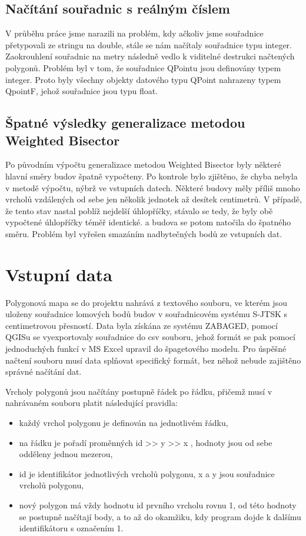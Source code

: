 \documentclass[11pt]{article}
\begin{document}
	
	\subsection{Načítání souřadnic s reálným číslem}
	V průběhu práce jsme narazili na problém, kdy ačkoliv jsme souřadnice přetypovali ze stringu na double, stále se nám načítaly souřadnice typu integer. Zaokrouhlení souřadnic na metry následně vedlo k viditelné destrukci načtených polygonů. Problém byl v tom, že souřadnice QPointu jsou definovány typem integer. Proto byly všechny objekty datového typu QPoint nahrazeny typem QpointF, jehož souřadnice jsou typu float.
	
	\subsection{Špatné výsledky generalizace metodou Weighted Bisector}
	Po původním výpočtu generalizace metodou Weighted Bisector byly některé hlavní směry budov špatně vypočteny. Po kontrole bylo zjištěno, že chyba nebyla v metodě výpočtu, nýbrž ve vstupních datech. Některé budovy měly příliš mnoho vrcholů vzdálených od sebe jen několik jednotek až desítek centimetrů. V případě, že tento stav nastal poblíž nejdelší úhlopříčky, stávalo se tedy, že byly obě vypočtené úhlopříčky téměř identické. a budova se potom natočila do špatného směru. Problém byl vyřešen smazáním nadbytečných bodů ze vstupních dat. 

	
	
	
	\section{Vstupní data}
	Polygonová mapa se do projektu nahrává z textového souboru, ve kterém jsou uloženy souřadnice lomových bodů budov v souřadnicovém systému S-JTSK s centimetrovou přesností. Data byla získána ze systému ZABAGED, pomocí QGISu se vyexportovaly souřadnice do csv souboru, jehož formát se pak pomocí jednoduchých funkcí v MS Excel upravil do špagetového modelu. Pro úspěšné načtení souboru musí data splňovat specifický formát, bez něhož nebude zajištěno správné načítání dat.  
	
	Vrcholy polygonů jsou načítány postupně řádek po řádku, přičemž musí v nahrávaném souboru platit následující pravidla:    
	
	\begin{itemize}
		\item každý vrchol polygonu je definován na jednotlivém řádku,
		\item na řádku je pořadí proměnných id >> y >> x   ,  hodnoty jsou od sebe odděleny  jednou mezerou,
		\item id je identifikátor jednotlivých vrcholů polygonu, x a y jsou souřadnice vrcholů polygonu,    
		\item nový polygon má vždy hodnotu id prvního vrcholu rovnu 1, od této hodnoty  se  postupně načítají body, a  to až do okamžiku,  kdy program dojde  k dalšímu identifikátoru s označením 1.   
	\end{itemize}
	
\end{document}
